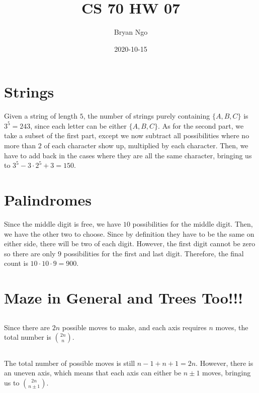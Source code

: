 \documentclass{article}
\title{CS 70 HW 07}
\author{Bryan Ngo}
\date{2020-10-15}
\begin{document}
\maketitle

\section{Strings}

Given a string of length \(5\), the number of strings purely containing \(\{A, B, C\}\) is \(3^5 = 243\), since each letter can be either \(\{A, B, C\}\).
As for the second part, we take a subset of the first part, except we now subtract all possibilities where no more than \(2\) of each character show up, multiplied by each character.
Then, we have to add back in the cases where they are all the same character, bringing us to \(3^5 - 3 \cdot 2^5 + 3 = 150\).

\section{Palindromes}

Since the middle digit is free, we have \(10\) possibilities for the middle digit.
Then, we have the other two to choose.
Since by definition they have to be the same on either side, there will be two of each digit.
However, the first digit cannot be zero so there are only \(9\) possibilities for the first and last digit.
Therefore, the final count is \(10 \cdot 10 \cdot 9 = 900\).

\section{Maze in General and Trees Too!!!}

\subsection{}

Since there are \(2n\) possible moves to make, and each axis requires \(n\) moves, the total number is \(\binom{2n}{n}\).

\subsection{}

The total number of possible moves is still \(n - 1 + n + 1 = 2n\).
However, there is an uneven axis, which means that each axis can either be \(n \pm 1\) moves, bringing us to \(\binom{2n}{n \pm 1}\).
\end{document}

